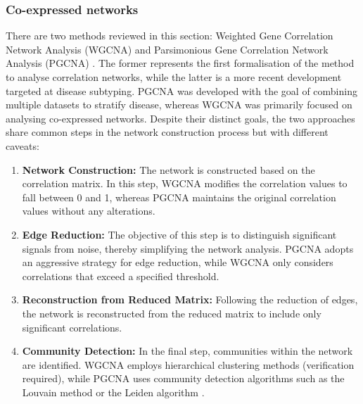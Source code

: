 \subsubsection{Co-expressed networks} \label{s:lit:co_net}


There are two methods reviewed in this section: Weighted Gene Correlation Network Analysis (WGCNA) \citet{Langfelder2008-sn} and Parsimonious Gene Correlation Network Analysis (PGCNA) \citet{Care2019-ij}. The former represents the first formalisation of the method to analyse correlation networks, while the latter is a more recent development targeted at disease subtyping. PGCNA was developed with the goal of combining multiple datasets to stratify disease, whereas WGCNA was primarily focused on analysing co-expressed networks. Despite their distinct goals, the two approaches share common steps in the network construction process but with different caveats:

\begin{enumerate}
    \item \textbf{Network Construction:} The network is constructed based on the correlation matrix. In this step, WGCNA modifies the correlation values to fall between 0 and 1, whereas PGCNA maintains the original correlation values without any alterations.
    
    \item \textbf{Edge Reduction:} The objective of this step is to distinguish significant signals from noise, thereby simplifying the network analysis. PGCNA adopts an aggressive strategy for edge reduction, while WGCNA only considers correlations that exceed a specified threshold.
    
    \item \textbf{Reconstruction from Reduced Matrix:} Following the reduction of edges, the network is reconstructed from the reduced matrix to include only significant correlations.
    
    \item \textbf{Community Detection:} In the final step, communities within the network are identified. WGCNA employs hierarchical clustering methods (verification required), while PGCNA uses community detection algorithms such as the Louvain method \citep{Blondel2008-ik} or the Leiden algorithm \citep{Traag2019-ne}.
\end{enumerate}

